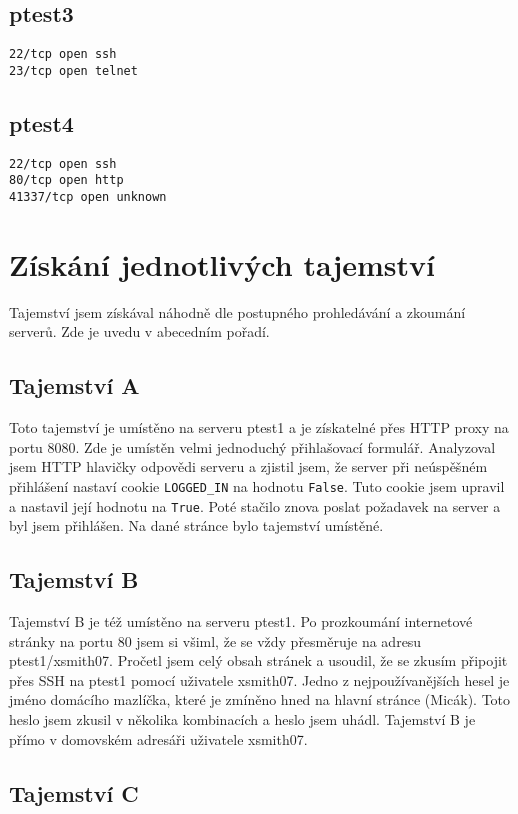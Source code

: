 \documentclass[11pt,a4paper]{article}
\begin{document}
\subsection{ptest3}
\texttt{22/tcp open  ssh\\
23/tcp open  telnet
}

\subsection{ptest4}
\texttt{22/tcp    open   ssh\\
80/tcp    open   http\\
41337/tcp open   unknown
}

\section{Získání jednotlivých tajemství}

Tajemství jsem získával náhodně dle postupného prohledávání a zkoumání serverů. Zde je uvedu v abecedním pořadí.

\subsection{Tajemství A}
Toto tajemství je umístěno na serveru ptest1 a je získatelné přes HTTP proxy na portu 8080. Zde je umístěn velmi jednoduchý přihlašovací formulář. Analyzoval jsem HTTP hlavičky odpovědi serveru a zjistil jsem, že server při neúspěšném přihlášení nastaví cookie \texttt{LOGGED\_IN} na hodnotu \texttt{False}. Tuto cookie jsem upravil a nastavil její hodnotu na \texttt{True}. Poté stačilo znova poslat požadavek na server a byl jsem přihlášen. Na dané stránce bylo tajemství umístěné.

\subsection{Tajemství B}
Tajemství B je též umístěno na serveru ptest1. Po prozkoumání internetové stránky na portu 80 jsem si všiml, že se vždy přesměruje na adresu ptest1/xsmith07. Pročetl jsem celý obsah stránek a usoudil, že se zkusím připojit přes SSH na ptest1 pomocí uživatele xsmith07. Jedno z nejpoužívanějších hesel je jméno domácího mazlíčka, které je zmíněno hned na hlavní stránce (Micák). Toto heslo jsem zkusil v několika kombinacích a heslo jsem uhádl. Tajemství B je přímo v domovském adresáři uživatele xsmith07.

\subsection{Tajemství C}
\end{document}
